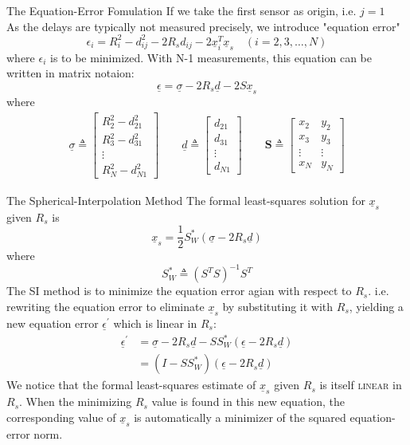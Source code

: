 \documentclass[10pt]{beamer}
\begin{document}
\begin{frame}{The Equation-Error Fomulation}
  If we take the first sensor as origin, i.e. $j=1$ \\
  As the delays are typically not measured precisely, we introduce "equation error"
  $$ \epsilon_{i} = R_{i}^2 - d_{ij}^2 -2R_{s}d_{ij} - 2\underline{x}_{i}^T \underline{x}_{s} \quad (i=2,3,\ldots,N) $$
  where $\epsilon_{i}$ is to be minimized.
  With N-1 measurements, this equation can be written in matrix notaion:
  $$ \underline{\epsilon} = \underline{\sigma} - 2R_{s}\underline{d} - 2S\underline{x}_{s} $$
  where
  \begin{align*}
    \underline{\sigma}\triangleq \begin{bmatrix} R_{2}^2 - d_{21}^2 \\ R_{3}^2 - d_{31}^2 \\ \vdots \\ R_{N}^2 - d_{N1}^2 \end{bmatrix} \qquad
    \underline{d}\triangleq \begin{bmatrix} d_{21}\\ d_{31} \\ \vdots \\ d_{N1} \end{bmatrix} \qquad
    \textbf{S} \triangleq \begin{bmatrix} x_2 & y_2 \\x_3 & y_3\\ \vdots & \vdots \\ x_N & y_N \end{bmatrix}
  \end{align*}
\end{frame}
\begin{frame}{The Spherical-Interpolation Method}
  The formal least-squares solution for $\underline{x}_s$ \alert{given} $R_s$ is
  $$ \underline{x}_s = \frac{1}{2} S_W^* (\underline{\sigma} - 2R_s\underline{d})$$
  where
  $$  S_W^* \triangleq (S^T S)^{-1}S^T $$
  The \alert{SI} method is to minimize the equation error agian with respect to $R_s$.
  i.e. rewriting the equation error to eliminate $\underline{x}_s$ by substituting it with $R_s$, yielding a new equation error $\underline{\epsilon}^{'}$ which is linear in $R_s$:
  \begin{align*}
   \underline{\epsilon}^{'} &= \underline{\sigma} - 2R_s\underline{d} - S S^*_W (\underline{\epsilon} - 2R_s\underline{d})\\
                            &= (I - S S_W^*)(\underline{\epsilon} - 2R_s\underline{d})
  \end{align*}
  We notice that the formal least-squares estimate of  $\underline{x}_s$ \alert{given} $R_s$ is itself \textsc{linear} in $R_s$. When the minimizing $R_s$ value is found
  in this new equation, the corresponding value of $\underline{x}_s$ is automatically a minimizer of the squared equation-error norm.
\end{frame}
\end{document}
